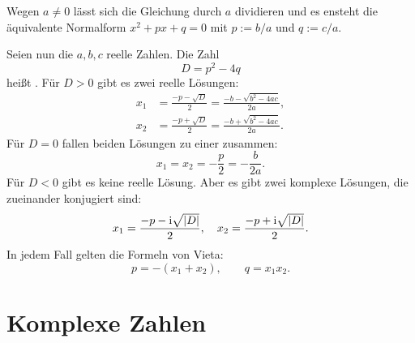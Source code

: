 \noindent
Wegen $a\ne 0$ lässt sich die Gleichung durch $a$ dividieren
und es ensteht die äquivalente Normalform $x^2+px+q=0$
mit $p:=b/a$ und $q:=c/a$.

\minisection{}
Seien nun die $a,b,c$ reelle Zahlen. Die Zahl
\begin{equation}
D = p^2-4q
\end{equation}
heißt . Für $D>0$ gibt es zwei reelle Lösungen:
\begin{align}
x_1 &= \frac{-p-\sqrt{D}}{2} = \frac{-b-\sqrt{b^2-4ac}}{2a},\\
x_2 &= \frac{-p+\sqrt{D}}{2} = \frac{-b+\sqrt{b^2-4ac}}{2a}.
\end{align}
Für $D=0$ fallen beiden Lösungen zu einer 
zusammen:
\begin{equation}
x_1 = x_2 = -\frac{p}{2} = -\frac{b}{2a}.
\end{equation}
Für $D<0$ gibt es keine reelle Lösung. Aber es gibt zwei komplexe
Lösungen, die zueinander konjugiert sind:
\begin{equation}
x_1 = \frac{-p-\mathrm i\sqrt{|D|}}{2},\quad
x_2 = \frac{-p+\mathrm i\sqrt{|D|}}{2}.
\end{equation}
In jedem Fall gelten die Formeln von Vieta:
\begin{equation}
p = -(x_1+x_2),\qquad q = x_1 x_2.
\end{equation}

\section{Komplexe Zahlen}

